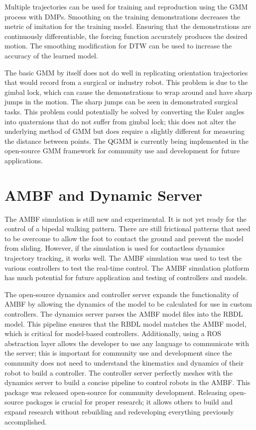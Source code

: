 Multiple trajectories can be used for training and reproduction using the GMM process with DMPs. Smoothing on the training demonstrations decreases the metric of imitation for the training model. Ensuring that the demonstrations are continuously differentiable, the forcing function accurately produces the desired motion. The smoothing modification for DTW can be used to increase the accuracy of the learned model. 

The basic GMM by itself does not do well in replicating orientation trajectories that would record from a surgical or industry robot. This problem is due to the gimbal lock, which can cause the demonstrations to wrap around and have sharp jumps in the motion. The sharp jumps can be seen in demonstrated surgical tasks. This problem could potentially be solved by converting the Euler angles into quaternions that do not suffer from gimbal lock; this does not alter the underlying method of GMM but does require a slightly different for measuring the distance between points. The QGMM is currently being implemented in the open-source GMM framework for community use and development for future applications. 

\section{AMBF and Dynamic Server}


The AMBF simulation is still new and experimental. It is not yet ready for the control of a bipedal walking pattern. There are still frictional patterns that need to be overcome to allow the foot to contact the ground and prevent the model from sliding. However, if the simulation is used for contactless dynamics trajectory tracking, it works well. The AMBF simulation was used to test the various controllers to test the real-time control. The AMBF simulation platform has much potential for future application and testing of controllers and models. 

The open-source dynamics and controller server expands the functionality of AMBF by allowing the dynamics of the model to be calculated for use in custom controllers. The dynamics server parses the AMBF model files into the RBDL model. This pipeline ensures that the RBDL model matches the AMBF model, which is critical for model-based controllers. Additionally, using a ROS abstraction layer allows the developer to use any language to communicate with the server; this is important for community use and development since the community does not need to understand the kinematics and dynamics of their robot to build a controller. The controller server perfectly meshes with the dynamics server to build a concise pipeline to control robots in the AMBF. This package was released open-source for community development. Releasing open-source packages is crucial for proper research; it allows others to build and expand research without rebuilding and redeveloping everything previously accomplished.   


